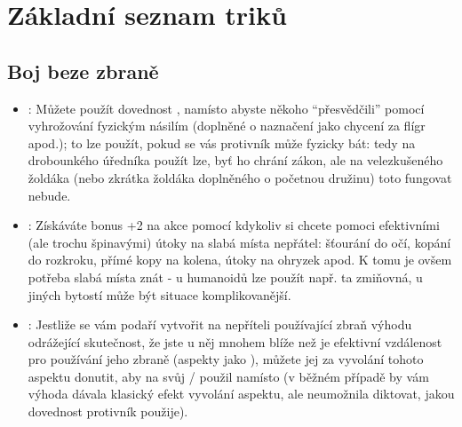 \documentclass[../main.tex]{subfiles}
\begin{document}
\section{Základní seznam triků}
\label{sec:trik-zakladni}

\subsection{Boj beze zbraně}
\label{sec:trik-bbz}
\begin{itemize}
\item{}:
  \label{sec:bbz-jau}
  Můžete použít dovednost , namísto  abyste někoho ``přesvědčili'' pomocí vyhrožování fyzickým násilím (doplněné o naznačení jako chycení za flígr apod.); to lze použít, pokud se vás protivník může fyzicky bát: tedy na drobounkého úředníka  použít lze, byť ho chrání zákon, ale na velezkušeného žoldáka (nebo zkrátka žoldáka doplněného o početnou družinu) toto fungovat nebude.
\item{}:
  \label{sec:bbz-slabiny}
  Získáváte bonus +2 na akce  pomocí  kdykoliv si chcete pomoci efektivními (ale trochu špinavými) útoky na slabá místa nepřátel: šťourání do očí, kopání do rozkroku, přímé kopy na kolena, útoky na ohryzek apod. K tomu je ovšem potřeba slabá místa znát - u humanoidů lze použít např. ta zmiňovná, u jiných bytostí může být situace komplikovanější.
\item{}:
  Jestliže se vám podaří vytvořit na nepříteli používající zbraň výhodu odrážející skutečnost, že jste u něj mnohem blíže než je efektivní vzdálenost pro používání jeho zbraně (aspekty jako ), můžete jej za vyvolání tohoto aspektu donutit, aby na svůj / použil  namísto  (v běžném případě by vám výhoda dávala klasický efekt vyvolání aspektu, ale neumožnila diktovat, jakou dovednost protivník použije).
\end{itemize}

  
\end{document}
